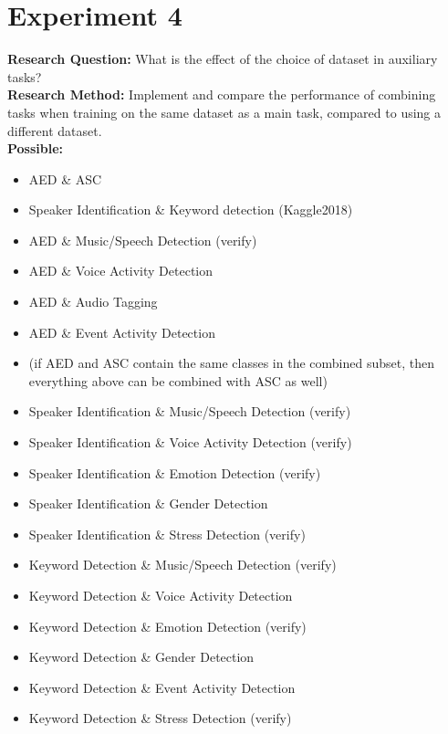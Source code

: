 \section{Experiment 4}

	\textbf{Research Question:} What is the effect of the choice of dataset in auxiliary tasks?\\
	
	\textbf{Research Method:} Implement and compare the performance of combining tasks when training on the same dataset as a main task, compared to using a different dataset. \\
	
	\textbf{Possible:} 
		
	\begin{itemize}
		\item AED \& ASC
		\item Speaker Identification \& Keyword detection (Kaggle2018)
		\item AED \& Music/Speech Detection (verify)
		\item AED \& Voice Activity Detection
		\item AED \& Audio Tagging
		\item AED \& Event Activity Detection
		\item (if AED and ASC contain the same classes in the combined subset, then everything above can be combined with ASC as well)
		\item Speaker Identification \& Music/Speech Detection (verify)
		\item Speaker Identification \& Voice Activity Detection (verify)
		\item Speaker Identification \& Emotion Detection (verify)
		\item Speaker Identification \& Gender Detection
		\item Speaker Identification \& Stress Detection (verify)
		\item Keyword Detection \&  Music/Speech Detection (verify)
		\item Keyword Detection \&  Voice Activity Detection
		\item Keyword Detection \&  Emotion Detection (verify)
		\item Keyword Detection \&  Gender Detection
		\item Keyword Detection \&  Event Activity Detection
		\item Keyword Detection \&  Stress Detection (verify)
	\end{itemize}